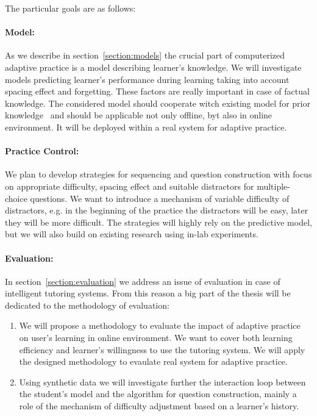 \documentclass[table,color,cover,twoside,nolot,nolof]{fithesis3/fithesis3}
\begin{document}
The particular goals are as follows:

\vspace{-.3cm}
\paragraph*{Model:} As we describe in section~\ref{section:models} the crucial
part of computerized adaptive practice is a model describing learner's
knowledge. We will investigate models predicting learner's performance during
learning taking into account spacing effect and forgetting. These factors are
really important in case of factual knowledge. The considered model should
cooperate witch existing model for prior knowledge~\cite{papousek2014adaptive}
and should be applicable not only offline, byt also in online environment. It
will be deployed within a real system for adaptive practice.

\vspace{-.3cm}
\paragraph{Practice Control:} We plan to develop strategies for sequencing and
question construction with focus on appropriate difficulty, spacing effect and
suitable distractors for multiple-choice questions. We want to introduce a
mechanism of variable difficulty of distractors, e.g. in the beginning of the
practice the distractors will be easy, later they will be more difficult. The
strategies will highly rely on the predictive model, but we will also build on
existing research using in-lab experiments.

\vspace{-.3cm}
\paragraph{Evaluation:} In section~\ref{section:evaluation} we address an issue
of evaluation in case of intelligent tutoring systems. From this reason a big
part of the thesis will be dedicated to the methodology of evaluation:
\begin{enumerate}
	\item We will propose a methodology to evaluate the impact of adaptive
		practice on user's learning in online environment. We want to cover both
		learning efficiency and learner's willingness to use the tutoring system.
		We will apply the designed methodology to evaulate real system for adaptive
		practice.
	\item Using synthetic data we will investigate further the interaction loop
		between the student's model and the algorithm for question construction,
		mainly a role of the mechanism of difficulty adjustment based on a learner's
		history.
\end{enumerate}
\end{document}
